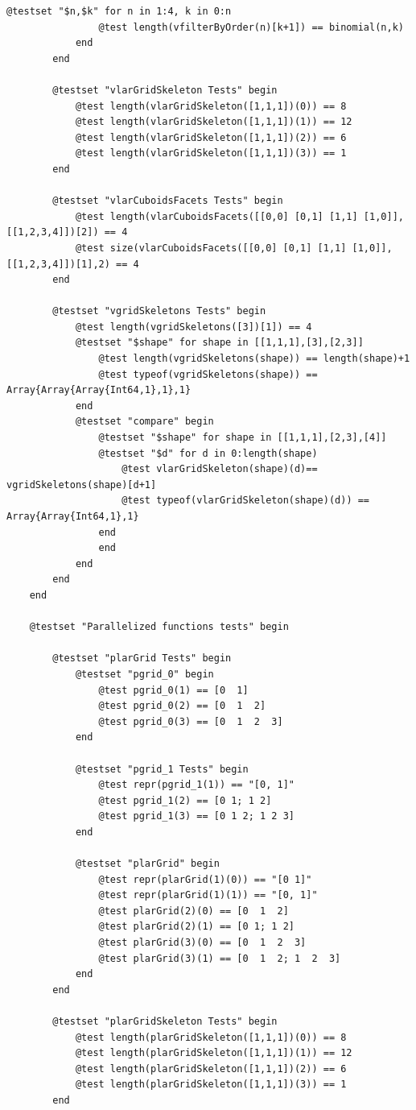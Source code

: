 \documentclass{article}
\begin{document}
\begin{flushleft}
\begin{list}{}{}
\begin{Verbatim}[tabsize=4]
		    @testset "$n,$k" for n in 1:4, k in 0:n
			    @test length(vfilterByOrder(n)[k+1]) == binomial(n,k)
		    end 
	    end

	    @testset "vlarGridSkeleton Tests" begin
		    @test length(vlarGridSkeleton([1,1,1])(0)) == 8
		    @test length(vlarGridSkeleton([1,1,1])(1)) == 12
		    @test length(vlarGridSkeleton([1,1,1])(2)) == 6
		    @test length(vlarGridSkeleton([1,1,1])(3)) == 1
	    end

	    @testset "vlarCuboidsFacets Tests" begin
		    @test length(vlarCuboidsFacets([[0,0] [0,1] [1,1] [1,0]], [[1,2,3,4]])[2]) == 4
		    @test size(vlarCuboidsFacets([[0,0] [0,1] [1,1] [1,0]], [[1,2,3,4]])[1],2) == 4 
	    end
	
	    @testset "vgridSkeletons Tests" begin
            @test length(vgridSkeletons([3])[1]) == 4
      	    @testset "$shape" for shape in [[1,1,1],[3],[2,3]]
			    @test length(vgridSkeletons(shape)) == length(shape)+1
			    @test typeof(vgridSkeletons(shape)) == Array{Array{Array{Int64,1},1},1}
		    end
		    @testset "compare" begin
			    @testset "$shape" for shape in [[1,1,1],[2,3],[4]]
			    @testset "$d" for d in 0:length(shape)
				    @test vlarGridSkeleton(shape)(d)== vgridSkeletons(shape)[d+1] 
				    @test typeof(vlarGridSkeleton(shape)(d)) == Array{Array{Int64,1},1}
			    end
			    end
		    end
	    end
	end
	
	@testset "Parallelized functions tests" begin
	
    	@testset "plarGrid Tests" begin
    		@testset "pgrid_0" begin
    			@test pgrid_0(1) == [0  1]
    			@test pgrid_0(2) == [0  1  2]
    			@test pgrid_0(3) == [0  1  2  3]
    		end
       
    		@testset "pgrid_1 Tests" begin
    			@test repr(pgrid_1(1)) == "[0, 1]"
    			@test pgrid_1(2) == [0 1; 1 2]
    			@test pgrid_1(3) == [0 1 2; 1 2 3]
    		end
   
    		@testset "plarGrid" begin
    			@test repr(plarGrid(1)(0)) == "[0 1]"
    			@test repr(plarGrid(1)(1)) == "[0, 1]"
    			@test plarGrid(2)(0) == [0  1  2]
    			@test plarGrid(2)(1) == [0 1; 1 2]
    			@test plarGrid(3)(0) == [0  1  2  3]
    			@test plarGrid(3)(1) == [0  1  2; 1  2  3]
    		end
    	end 

    	@testset "plarGridSkeleton Tests" begin
    		@test length(plarGridSkeleton([1,1,1])(0)) == 8
    		@test length(plarGridSkeleton([1,1,1])(1)) == 12
    		@test length(plarGridSkeleton([1,1,1])(2)) == 6
    		@test length(plarGridSkeleton([1,1,1])(3)) == 1
    	end


\end{Verbatim}
\end{list}
\end{flushleft}
\end{document}
